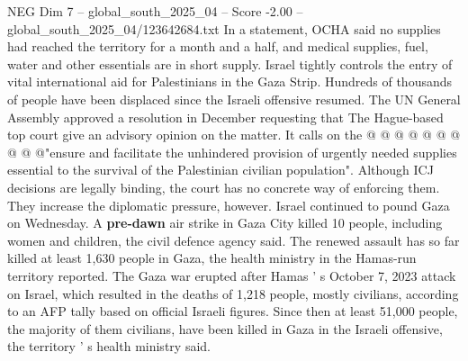 \begin{textsample}{NEG Dim 7 – global\_south\_2025\_04 – Score -2.00 – global\_south\_2025\_04/123642684.txt}
In a statement, OCHA said no supplies had reached the territory for a month and a half, and medical supplies, fuel, water and other essentials are in short supply.
Israel tightly controls the entry of vital international aid for Palestinians in the Gaza Strip.
Hundreds of thousands of people have been displaced since the Israeli offensive resumed.
The UN General Assembly approved a resolution in December requesting that The Hague-based top court give an advisory opinion on the matter.
It calls on the @ @ @ @ @ @ @ @ @ @"ensure and facilitate the unhindered provision of urgently needed supplies essential to the survival of the Palestinian civilian population".
Although ICJ decisions are legally binding, the court has no concrete way of enforcing them.
They increase the diplomatic pressure, however.
Israel continued to pound Gaza on Wednesday.
A \textbf{pre-dawn} air strike in Gaza City killed 10 people, including women and children, the civil defence agency said.
The renewed assault has so far killed at least 1,630 people in Gaza, the health ministry in the Hamas-run territory reported.
The Gaza war erupted after Hamas ' s October 7, 2023 attack on Israel, which resulted in the deaths of 1,218 people, mostly civilians, according to an AFP tally based on official Israeli figures.
Since then at least 51,000 people, the majority of them civilians, have been killed in Gaza in the Israeli offensive, the territory ' s health ministry said.

\end{textsample}
